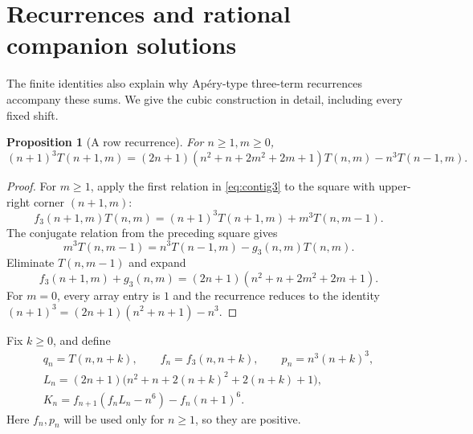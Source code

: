 \documentclass[11pt]{article}
\numberwithin{equation}{section}
\newtheorem{proposition}[theorem]{Proposition}
\theoremstyle{definition}
\theoremstyle{remark}
\newcommand{\Apery}{Ap\'ery}
\begin{document}
\section{Recurrences and rational companion solutions}\label{sec:recurrences}

The finite identities also explain why \Apery{}-type three-term
recurrences accompany these sums. We give the cubic construction in
detail, including every fixed shift.

\begin{proposition}[A row recurrence]\label{prop:rowrec}
For $n\geq1,m\geq0$,
\begin{equation}\label{eq:rowrec}
 (n+1)^3T(n+1,m)
 =(2n+1)(n^2+n+2m^2+2m+1)T(n,m)-n^3T(n-1,m).
\end{equation}
\end{proposition}
\begin{proof}
For $m\geq1$, apply the first relation in \eqref{eq:contig3} to the
square with upper-right corner $(n+1,m)$:
\[
 f_3(n+1,m)T(n,m)=(n+1)^3T(n+1,m)+m^3T(n,m-1).
\]
The conjugate relation from the preceding square gives
\[
 m^3T(n,m-1)=n^3T(n-1,m)-g_3(n,m)T(n,m).
\]
Eliminate $T(n,m-1)$ and expand
\[
 f_3(n+1,m)+g_3(n,m)
 =(2n+1)(n^2+n+2m^2+2m+1).
\]
For $m=0$, every array entry is $1$ and the recurrence reduces to the
identity $(n+1)^3=(2n+1)(n^2+n+1)-n^3$.
\end{proof}

Fix $k\geq0$, and define
\begin{gather}
 q_n=T(n,n+k),\qquad f_n=f_3(n,n+k),\qquad p_n=n^3(n+k)^3,\label{eq:recdefs}\\
 L_n=(2n+1)\bigl(n^2+n+2(n+k)^2+2(n+k)+1\bigr),\nonumber\\
 K_n=f_{n+1}(f_nL_n-n^6)-f_n(n+1)^6.\label{eq:Kn}
\end{gather}
Here $f_n,p_n$ will be used only for $n\geq1$, so they are positive.
\end{document}
